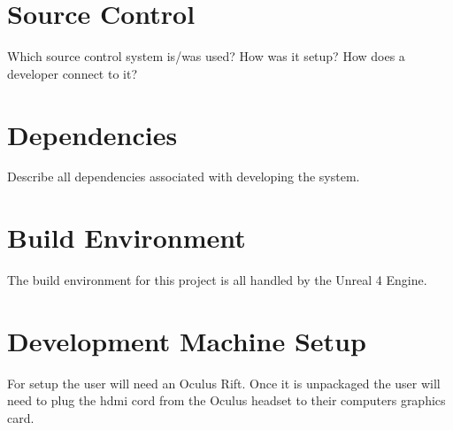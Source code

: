 \section{Source  Control}
Which source control system is/was used?  How was it setup?  How does a developer 
connect to it? 

\section{Dependencies}
Describe all dependencies associated with developing the system. 

\section{Build  Environment}
The build environment for this project is all handled by the Unreal 4 Engine.

\section{Development Machine Setup}
For setup the user will need an Oculus Rift. Once it is unpackaged the user will need to plug the hdmi cord from the Oculus headset to their computers graphics card. 


